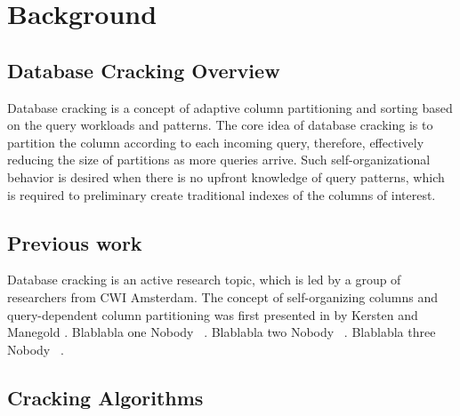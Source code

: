 \section{Background}
\label{sec:background}
\subsection{Database Cracking Overview}

Database cracking is a concept of adaptive column partitioning and sorting based on the query workloads and patterns. The core idea of database cracking is to partition the column according to each incoming query, therefore, effectively reducing the size of partitions as more queries arrive. Such self-organizational behavior is desired when there is no upfront knowledge of query patterns, which is required to preliminary create traditional indexes of the columns of interest.

\subsection{Previous work}
Database cracking is an active research topic, which is led by a group of researchers from CWI Amsterdam. The concept of self-organizing columns and query-dependent column partitioning was first presented in by Kersten and Manegold \cite{kersten_2005}. 
Blablabla one Nobody ~\cite{schuhknecht_2014}.
Blablabla two Nobody ~\cite{idreos_2007}.
Blablabla three Nobody ~\cite{kersten_2005}.
\subsection{Cracking Algorithms}


